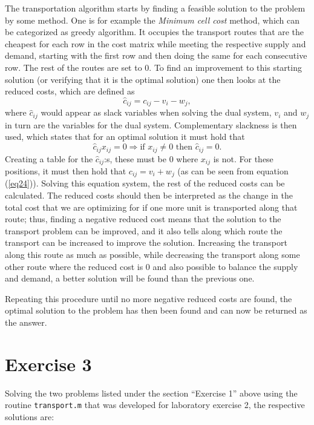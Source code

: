 \documentclass{article}
\begin{document}
  \noindent
  The transportation algorithm starts by finding a feasible solution to the problem by some method. One is for example the \textit{Minimum cell cost} method, which can be categorized as greedy algorithm. It occupies the transport routes that are the cheapest for each row in the cost matrix while meeting the respective supply and demand, starting with the first row and then doing the same for each consecutive row. The rest of the routes are set to 0.
  To find an improvement to this starting solution (or verifying that it is the optimal solution) one then looks at the reduced costs, which are defined as
  \begin{equation}
    \hat{c}_{ij} = c_{ij} - v_i - w_j,
    \label{eq24}
  \end{equation}
  where $\hat{c}_{ij}$ would appear as slack variables when solving the dual system, $v_i$ and $w_j$ in turn are the variables for the dual system. Complementary slackness is then used, which states that for an optimal solution it must hold that
  \begin{equation*}
    \hat{c}_{ij}x_{ij} = 0 \Rightarrow \text{if } x_{ij} \neq 0 \text{ then } \hat{c}_{ij} = 0.
  \end{equation*}
  Creating a table for the $\hat{c}_{ij}$:s, these must be 0 where $x_{ij}$ is not. For these positions, it must then hold that $c_{ij} = v_i + w_j$ (as can be seen from equation (\ref{eq24})). Solving this equation system, the rest of the reduced costs can be calculated. The reduced costs should then be interpreted as the change in the total cost that we are optimizing for if one more unit is transported along that route; thus, finding a negative reduced cost means that the solution to the transport problem can be improved, and it also tells along which route the transport can be increased to improve the solution. Increasing the transport along this route as much as possible, while decreasing the transport along some other route where the reduced cost is 0 and also possible to balance the supply and demand, a better solution will be found than the previous one.

  Repeating this procedure until no more negative reduced costs are found, the optimal solution to the problem has then been found and can now be returned as the answer.

  \section*{Exercise 3}
  Solving the two problems listed under the section ``Exercise 1'' above using the routine \texttt{transport.m} that was developed for laboratory exercise 2, the respective solutions are:
\end{document}
